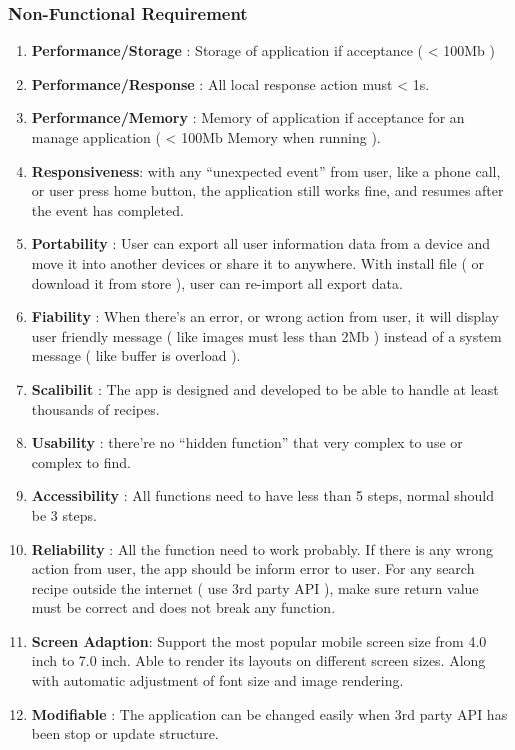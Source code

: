 \documentclass{article}
\begin{document}
\begin{enumerate}
\end{enumerate}



\subsubsection{ Non-Functional Requirement}
\begin{enumerate}
\item \textbf{Performance/Storage} : Storage of application if acceptance ( < 100Mb )
\item \textbf{Performance/Response} : All local response action must < 1s.
\item \textbf{Performance/Memory} : Memory of application if acceptance for an manage application ( < 100Mb Memory when running ).
\item \textbf{Responsiveness}: with any “unexpected event” from user, like a phone call, or user press home button, the application still works fine, and resumes after the event has completed. 
\item \textbf{Portability} : User can export all user information data from a device and move it into another devices or share it to anywhere. With install file ( or download it from store ), user can re-import all export data.
\item \textbf{Fiability} : When there's an error, or wrong action from user, it will display user friendly message ( like images must less than 2Mb ) instead of a system message ( like buffer is overload ).
\item \textbf{Scalibilit} : The app is designed and developed to be able to handle at least thousands of recipes. 
\item \textbf{Usability} : there’re no “hidden function” that very complex to use or complex to find. 
\item \textbf{Accessibility} : All functions need to have less than 5 steps, normal should be 3 steps. 
\item \textbf{Reliability} : All the function need to work probably. If there is any wrong action from user, the app should be inform error to user. For any search recipe outside the internet ( use 3rd party API ), make sure return value must be correct and does not break any function. 
\item \textbf{Screen Adaption}: Support the most popular mobile screen size from 4.0 inch to 7.0 inch. Able to render its layouts on different screen sizes. Along with automatic adjustment of font size and image rendering. 
\item \textbf{Modifiable} : The application can be changed easily when 3rd party API has been stop or update structure. 

\end{enumerate}
\end{document}
